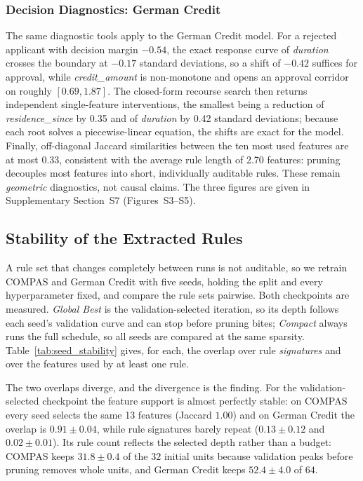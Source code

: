\subsubsection{Decision Diagnostics: German Credit}
The same diagnostic tools apply to the German Credit model. For a rejected
applicant with decision margin $-0.54$, the exact response curve of
\textit{duration} crosses the boundary at $-0.17$ standard deviations, so a shift
of $-0.42$ suffices for approval, while \textit{credit\_amount} is non-monotone
and opens an approval corridor on roughly $[0.69, 1.87]$. The closed-form
recourse search then returns independent single-feature interventions, the
smallest being a reduction of \textit{residence\_since} by 0.35 and of
\textit{duration} by 0.42 standard deviations; because each root solves a
piecewise-linear equation, the shifts are exact for the model. Finally,
off-diagonal Jaccard similarities between the ten most used features are at most
0.33, consistent with the average rule length of 2.70 features: pruning decouples
most features into short, individually auditable rules. These remain
\emph{geometric} diagnostics, not causal claims. The three figures are given in
Supplementary Section~S7 (Figures~S3--S5).

\subsection{Stability of the Extracted Rules}
\label{subsec:stability}

A rule set that changes completely between runs is not auditable, so we retrain
COMPAS and German Credit with five seeds, holding the split and every
hyperparameter fixed, and compare the rule sets pairwise. Both checkpoints are
measured. \emph{Global Best} is the validation-selected iteration, so its depth
follows each seed's validation curve and can stop before pruning bites;
\emph{Compact} always runs the full schedule, so all seeds are compared at the
same sparsity. Table~\ref{tab:seed_stability} gives, for each, the overlap over
rule \emph{signatures} and over the features used by at least one rule.

The two overlaps diverge, and the divergence is the finding. For the
validation-selected checkpoint the feature support is almost perfectly stable: on
COMPAS every seed selects the same 13 features (Jaccard $1.00$) and on German
Credit the overlap is $0.91 \pm 0.04$, while rule signatures barely repeat
($0.13 \pm 0.12$ and $0.02 \pm 0.01$). Its rule count reflects the selected depth
rather than a budget: COMPAS keeps $31.8 \pm 0.4$ of the $32$ initial units
because validation peaks before pruning removes whole units, and German Credit
keeps $52.4 \pm 4.0$ of $64$.

